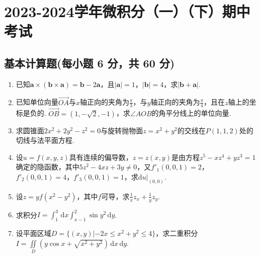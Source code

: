 \documentclass[../main.tex]{subfiles}
\begin{document}
\chapter{2023-2024学年微积分（一）（下）期中考试}

\section{基本计算题(每小题 6 分，共 60 分)}
\begin{enumerate}
    \item 已知$\boldsymbol{a}\times (\boldsymbol{b}\times \boldsymbol{a}) = \boldsymbol
              {b}-2\boldsymbol{a}$，且$|\boldsymbol{a}|=1$，$|\boldsymbol{b}|=4$，求$|\boldsymbol
              {b}+\boldsymbol{a}|$.
          \vspace{10em}

    \item 已知单位向量$\overrightarrow{OA}$与$x$轴正向的夹角为$\frac{\pi}{3}$，与$y$轴正向的夹角为$\frac{\pi}{4}$，且在$z$轴上的坐标是负的.
          $\overrightarrow{OB}=\left(1,-\sqrt{2},-1\right)$，求$\angle AOB$的角平分线上的单位向量.
          \vspace{12em}

    \item 求圆锥面$2x^{2}+2y^{2}-z^{2}=0$与旋转抛物面$z=x^{2}+y^{2}$的交线在$P(1,
              1,2)$处的切线与法平面方程.
          \vspace{12em}

    \item 设$u=f(x,y,z)$具有连续的偏导数，$z=z(x,y)$是由方程$z^{5}-xz^{4}+yz^{3}=
              1$确定的隐函数，其中$5z^{2}-4xz+3y\neq0$，又$f'_{1}(0,0,1)=2$，$f'_{2}(0,0,
              1)=4$，$f'_{3}(0,0,1)=1$，求$\left.\mathrm{d}u\right|_{(0,0)}$.
          \vspace{12em}

    \item 设$z=yf(x^{2}-y^{2})$，其中$f$可导，求$\frac{1}{x}z_{x}+\frac{1}{y}z_{y}$.
          \vspace{12em}

    \item 求积分$I=\int_{1}^{3}\,\mathrm{d}x\int_{x-1}^{2}\sin y^{2}\,\mathrm{d}y$.
          \vspace{12em}

    \item 设平面区域$D=\{(x,y)|-2x\leq x^{2}+y^{2}\leq 4\}$，求二重积分$I=\iint\limits
              _{D}\left(y\cos x+\sqrt{x^{2}+y^{2}}\right)\,\mathrm{d}x\,\mathrm{d}y$.
          \vspace{12em}


\end{enumerate}
\end{document}

